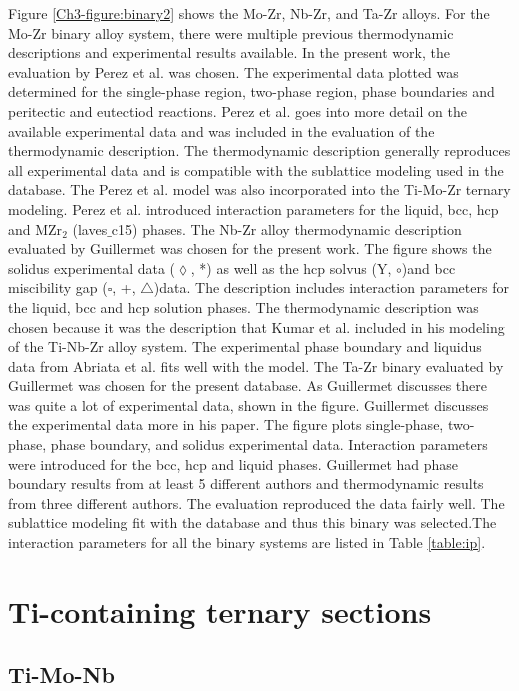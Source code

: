Figure \ref{Ch3-figure:binary2} shows the Mo-Zr, Nb-Zr, and Ta-Zr alloys. For the Mo-Zr binary alloy system, there were multiple previous thermodynamic descriptions and experimental results available. In the present work, the evaluation by Perez et al. \cite{Perez2003} was chosen. The experimental data plotted was determined for the single-phase region, two-phase region, phase boundaries and peritectic and eutectiod reactions. Perez et al. goes into more detail on the available experimental data and was included in the evaluation of the thermodynamic description. The thermodynamic description generally reproduces all experimental data and is compatible with the sublattice modeling used in the database. The Perez et al. model was also incorporated into the Ti-Mo-Zr ternary modeling. Perez et al. introduced interaction parameters for the liquid, bcc, hcp and MZr$_2$ (laves$\_$c15) phases. The Nb-Zr alloy thermodynamic description evaluated by Guillermet \cite{Guillermet1991} was chosen for the present work. The figure shows the solidus experimental data ($\lozenge$, *) as well as the hcp solvus (Y, $\circ$)and bcc miscibility gap ($\square$, +, $\triangle$)data. The description includes interaction parameters for the liquid, bcc and hcp solution phases. The thermodynamic description was chosen because it was the description that Kumar et al. \cite{Kumar1994a} included in his modeling of the Ti-Nb-Zr alloy system. The experimental phase boundary and liquidus data from Abriata et al. \cite{Abriata1982} fits well with the model. The Ta-Zr binary evaluated by Guillermet \cite{Guillermet1995} was chosen for the present database. As Guillermet discusses there was quite a lot of experimental data, shown in the figure. Guillermet discusses the experimental data more in his paper. The figure plots single-phase, two-phase, phase boundary, and solidus experimental data. Interaction parameters were introduced for the bcc, hcp and liquid phases. Guillermet had phase boundary results from at least 5 different authors and thermodynamic results from three different authors. The evaluation reproduced the data fairly well. The sublattice modeling fit with the database and thus this binary was selected.The interaction parameters for all the binary systems are listed in Table \ref{table:ip}.

\section{Ti-containing ternary sections}

\subsection{Ti-Mo-Nb}

